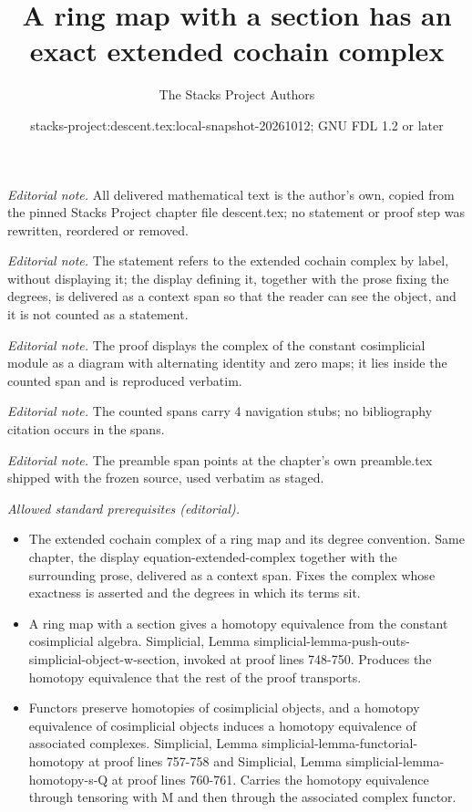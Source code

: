 \documentclass{stacks-project}
\title{A ring map with a section has an exact extended cochain complex}
\author{The Stacks Project Authors}
\date{stacks-project:descent.tex:local-snapshot-20261012; GNU FDL 1.2 or later}
\theoremstyle{plain}
\theoremstyle{definition}
\theoremstyle{remark}
\numberwithin{equation}{subsection}
\begin{document}
\maketitle
\noindent\textit{Editorial note.} All delivered mathematical text is the author's own, copied from the pinned Stacks Project chapter file descent.tex; no statement or proof step was rewritten, reordered or removed.\par\medskip
\noindent\textit{Editorial note.} The statement refers to the extended cochain complex by label, without displaying it; the display defining it, together with the prose fixing the degrees, is delivered as a context span so that the reader can see the object, and it is not counted as a statement.\par\medskip
\noindent\textit{Editorial note.} The proof displays the complex of the constant cosimplicial module as a diagram with alternating identity and zero maps; it lies inside the counted span and is reproduced verbatim.\par\medskip
\noindent\textit{Editorial note.} The counted spans carry 4 navigation stubs; no bibliography citation occurs in the spans.\par\medskip
\noindent\textit{Editorial note.} The preamble span points at the chapter's own preamble.tex shipped with the frozen source, used verbatim as staged.\par\medskip
\noindent\textit{Allowed standard prerequisites (editorial).}\begin{itemize}
\item The extended cochain complex of a ring map and its degree convention. Same chapter, the display equation-extended-complex together with the surrounding prose, delivered as a context span. Fixes the complex whose exactness is asserted and the degrees in which its terms sit.
\item A ring map with a section gives a homotopy equivalence from the constant cosimplicial algebra. Simplicial, Lemma simplicial-lemma-push-outs-simplicial-object-w-section, invoked at proof lines 748-750. Produces the homotopy equivalence that the rest of the proof transports.
\item Functors preserve homotopies of cosimplicial objects, and a homotopy equivalence of cosimplicial objects induces a homotopy equivalence of associated complexes. Simplicial, Lemma simplicial-lemma-functorial-homotopy at proof lines 757-758 and Simplicial, Lemma simplicial-lemma-homotopy-s-Q at proof lines 760-761. Carries the homotopy equivalence through tensoring with M and then through the associated complex functor.
\end{itemize}\medskip
\end{document}
